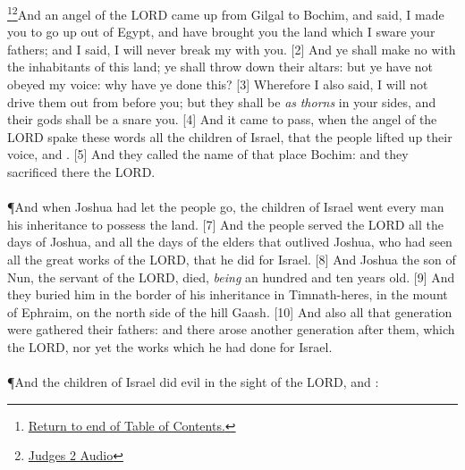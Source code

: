\footnote{\textcolor[cmyk]{0.99998,1,0,0}{\hyperlink{TOC}{Return to end of Table of Contents.}}}\footnote{\href{https://audiobible.com/bible/judges_2.html}{\textcolor[cmyk]{0.99998,1,0,0}{Judges 2 Audio}}}\textcolor[cmyk]{0.99998,1,0,0}{And an angel of the LORD came up from Gilgal to Bochim, and said, I made you to go up out of Egypt, and have brought you  the land which I sware  your fathers; and I said, I will never break my  with you.}
[2] \textcolor[cmyk]{0.99998,1,0,0}{And ye shall make no  with the inhabitants of this land; ye shall throw down their altars: but ye have not obeyed my voice: why have ye done this?}
[3] \textcolor[cmyk]{0.99998,1,0,0}{Wherefore I also said, I will not drive them out from before you; but they shall be \emph{as} \emph{thorns} in your sides, and their gods shall be a snare  you.}
[4] \textcolor[cmyk]{0.99998,1,0,0}{And it came to pass, when the angel of the LORD spake these words  all the children of Israel, that the people lifted up their voice, and .}
[5] \textcolor[cmyk]{0.99998,1,0,0}{And they called the name of that place Bochim: and they sacrificed there  the LORD.}\\
\\
\P \textcolor[cmyk]{0.99998,1,0,0}{And when Joshua had let the people go, the children of Israel went every man  his inheritance to possess the land.}
[7] \textcolor[cmyk]{0.99998,1,0,0}{And the people served the LORD all the days of Joshua, and all the days of the elders that outlived Joshua, who had seen all the great works of the LORD, that he did for Israel.}
[8] \textcolor[cmyk]{0.99998,1,0,0}{And Joshua the son of Nun, the servant of the LORD, died, \emph{being} an hundred and ten years old.}
[9] \textcolor[cmyk]{0.99998,1,0,0}{And they buried him in the border of his inheritance in Timnath-heres, in the mount of Ephraim, on the north side of the hill Gaash.}
[10] \textcolor[cmyk]{0.99998,1,0,0}{And also all that generation were gathered  their fathers: and there arose another generation after them, which  the LORD, nor yet the works which he had done for Israel.}\\
\\
\P \textcolor[cmyk]{0.99998,1,0,0}{And the children of Israel did evil in the sight of the LORD, and  :}
